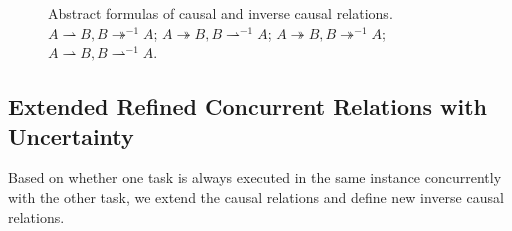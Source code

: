 \documentclass{llncs}
\begin{document}
\begin{figure}[!htb]
{\begin{minipage}[b]{0.45\textwidth}
	\end{minipage}
	\label{fig:causalCaseB}
}
\caption{Abstract formulas of causal and inverse causal relations.  $A\rightharpoonup B, B\twoheadrightarrow^{-1}A$;  $A\twoheadrightarrow B, B\rightharpoonup^{-1}A$;  $A\twoheadrightarrow B, B\twoheadrightarrow^{-1}A$;  $A\rightharpoonup B, B\rightharpoonup^{-1}A$.}
\label{fig:causalCases}
\end{figure}

\subsection{Extended Refined Concurrent Relations with Uncertainty}\label{subsec:concurrent}
Based on whether one task is always executed in the same instance concurrently with the other task, we extend the causal relations and define new inverse causal relations.

\begin{definition}\label{def:alwaysConcurrent}
\end{definition}
\end{document}
